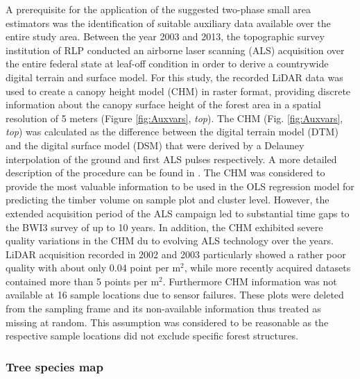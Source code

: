 A prerequisite for the application of the suggested two-phase small area estimators was the identification of suitable auxiliary data available over the entire study area. Between the year 2003 and 2013, the topographic survey institution of RLP conducted an airborne laser scanning (ALS) acquisition over the entire federal state at leaf-off condition in order to derive a countrywide digital terrain and surface model. For this study, the recorded LiDAR data was used to create a canopy height model (CHM) in raster format, providing discrete information about the canopy surface height of the forest area in a spatial resolution of 5 meters (Figure \ref{fig:Auxvars}, \textit{top}). The CHM (Fig. \ref{fig:Auxvars}, \textit{top}) was calculated as the difference between the digital terrain model (DTM) and the digital surface model (DSM) that were derived by a Delauney interpolation of the ground and first ALS pulses respectively. A more detailed description of the procedure can be found in \citet{hill2017a}. The CHM was considered to provide the most valuable information to be used in the OLS regression model for predicting the timber volume on sample plot and cluster level. However, the extended acquisition period of the ALS campaign led to substantial time gaps to the BWI3 survey of up to 10 years. In addition, the CHM exhibited severe quality variations in the CHM du to evolving ALS technology over the years. LiDAR acquisition recorded in 2002 and 2003 particularly showed a rather poor quality with about only 0.04 point per m$^2$, while more recently acquired datasets contained more than 5 points per m$^2$. Furthermore CHM information was not available at 16 sample locations due to sensor failures. These plots were deleted from the sampling frame and its non-available information thus treated as missing at random. This assumption was considered to be reasonable as the respective sample locations did not exclude specific forest structures.

\subsubsection{Tree species map}
\label{sec:tspecclass}

